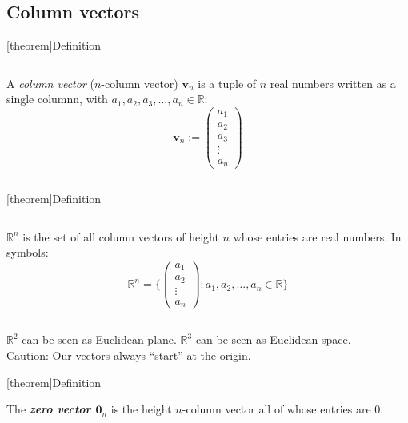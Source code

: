 \documentclass[12pt]{report}
\theoremstyle{definition}
\begin{document}
\subsection{Column vectors}

[theorem]{Definition}
\begin{column vector}
    A \emph{column vector} ($n$-column vector) $\pmb{v}_n$ is a tuple of $n$ real numbers written as a single columnn, 
    with $a_1, a_2, a_3, \ldots, a_n \in \mathbb{R}$:\[
    \pmb{v}_n := 
    \begin{pmatrix}
        a_1 \\
        a_2 \\
        a_3 \\
        \vdots \\
        a_n
    \end{pmatrix}
    \]
\end{column vector}

[theorem]{Definition}
\begin{set of column vectors}
    $\mathbb{R}^{n}$ is the set of all column vectors of height $n$ whose entries are real numbers.
    In symbols:\[
        \mathbb{R}^{n} = \{
            \begin{pmatrix}
                    a_1\\
                    a_2\\
                    \vdots\\
                    a_n
            \end{pmatrix}
            : a_1, a_2, \ldots, a_n \in \mathbb{R}
        \} 
    \]
\end{set of column vectors}

\begin{ex}
    $\mathbb{R}^{2}$ can be seen as Euclidean plane. $\mathbb{R}^{3}$ can be seen as Euclidean space.
    \\\underline{Caution}: Our vectors always ``start'' at the origin.
\end{ex}

[theorem]{Definition}
\begin{zero vector}
    The \textbf{\emph{zero vector $\pmb{0}_n$}} is the height $n$-column vector all of whose entries are 0.
\end{zero vector}
\end{document}
